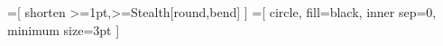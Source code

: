 =[
  shorten >=1pt,>={Stealth[round,bend]}
]
=[
  circle, fill=black, inner sep=0, minimum size=3pt
]
